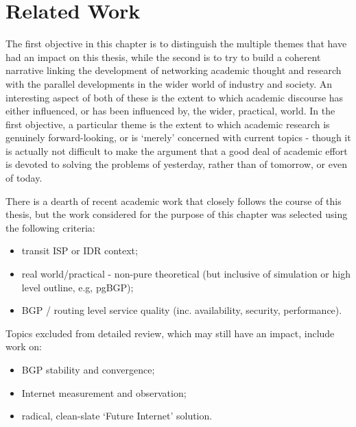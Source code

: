 \chapter{Related Work}
The first objective in this chapter is to distinguish the multiple themes that have had an impact on this thesis, while the second is to try to build a coherent narrative linking the development of networking academic thought and research with the parallel developments in the wider world of industry and society.
An interesting aspect of both of these is the extent to which academic discourse has either influenced, or  has been influenced by, the wider, practical, world.
In the first objective, a particular theme is the extent to which academic research is genuinely forward-looking, or is `merely' concerned with current topics - though it is actually not difficult to make the argument that a good deal of academic effort is devoted to solving the problems of yesterday, rather than of tomorrow, or even of today.

\medskip
There is a dearth of recent academic work that closely follows the course of this thesis, but the work considered for the purpose of this chapter was selected using the following criteria:

\begin{itemize}[noitemsep,nolistsep]
	\item{transit ISP or IDR context;}
	\item{real world/practical - non-pure theoretical (but inclusive of simulation or high level outline, e.g, pgBGP);}
	\item{BGP / routing level service quality (inc. availability, security, performance).}
\end{itemize}
\medskip
Topics excluded from detailed review, which may still have an impact, include work on:

\begin{itemize}[noitemsep,nolistsep]
	\item{BGP stability and convergence;}
	\item{Internet measurement and observation;}
	\item{radical, clean-slate `Future Internet' solution.}
\end{itemize}
\smallskip


